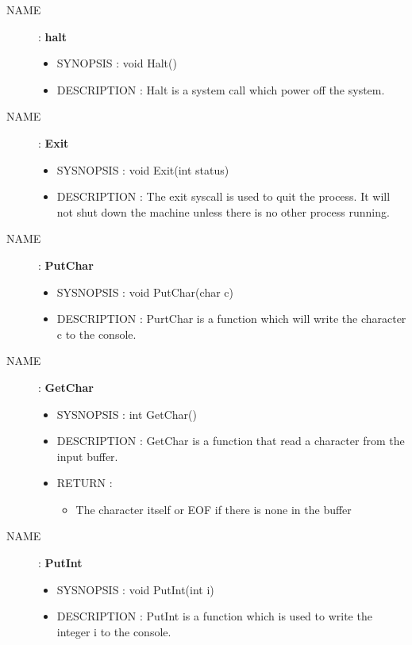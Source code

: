 \begin{description}
    \item [NAME] : \textbf{halt}
        \begin{itemize}
            \item SYNOPSIS : void Halt()
            \item DESCRIPTION :
                Halt is a system call which power off the system.
        \end{itemize}


    \item [NAME] : \textbf{Exit}
        \begin{itemize}
            \item SYSNOPSIS : void Exit(int status)
            \item DESCRIPTION :
                The exit syscall is used to quit the process. It will not shut down the
                machine unless there is no other process running.
        \end{itemize}

    \item [NAME] : \textbf{PutChar}
        \begin{itemize}
            \item SYSNOPSIS : void PutChar(char c)
            \item DESCRIPTION :
                PurtChar is a function which will write the character c to the console.
        \end{itemize}

    \item [NAME] : \textbf{GetChar}
        \begin{itemize}
            \item SYSNOPSIS : int GetChar()
            \item DESCRIPTION :
                GetChar is a function that read a character from the input buffer.
            \item RETURN :
                \begin{itemize}
                    \item The character itself or EOF if there is none in the buffer
                \end{itemize}
        \end{itemize}

    \item [NAME] : \textbf{PutInt}
        \begin{itemize}
            \item SYSNOPSIS : void PutInt(int i)
            \item DESCRIPTION :
                PutInt is a function which is used to write the integer i to the console.
        \end{itemize}


\end{description}

